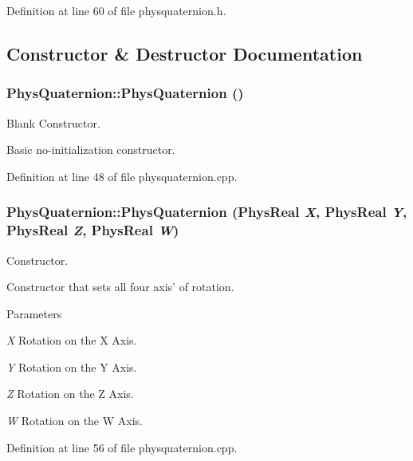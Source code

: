Definition at line 60 of file physquaternion.h.



\subsection{Constructor \& Destructor Documentation}
\hypertarget{classPhysQuaternion_afa90934d42b3a55d4b06bcf4c076123b}{
\subsubsection[{PhysQuaternion}]{\setlength{\rightskip}{0pt plus 5cm}PhysQuaternion::PhysQuaternion ()}}
\label{d5/d19/classPhysQuaternion_afa90934d42b3a55d4b06bcf4c076123b}


Blank Constructor. 

Basic no-\/initialization constructor. 

Definition at line 48 of file physquaternion.cpp.

\hypertarget{classPhysQuaternion_aa0cbd53e7a9e624a3f0f22aa94618e17}{
\subsubsection[{PhysQuaternion}]{\setlength{\rightskip}{0pt plus 5cm}PhysQuaternion::PhysQuaternion (PhysReal {\em X}, \/  PhysReal {\em Y}, \/  PhysReal {\em Z}, \/  PhysReal {\em W})}}
\label{d5/d19/classPhysQuaternion_aa0cbd53e7a9e624a3f0f22aa94618e17}


Constructor. 

Constructor that sets all four axis' of rotation. 
\begin{DoxyParams}{Parameters}
\item[{\em X}]Rotation on the X Axis. \item[{\em Y}]Rotation on the Y Axis. \item[{\em Z}]Rotation on the Z Axis. \item[{\em W}]Rotation on the W Axis. \end{DoxyParams}


Definition at line 56 of file physquaternion.cpp.



